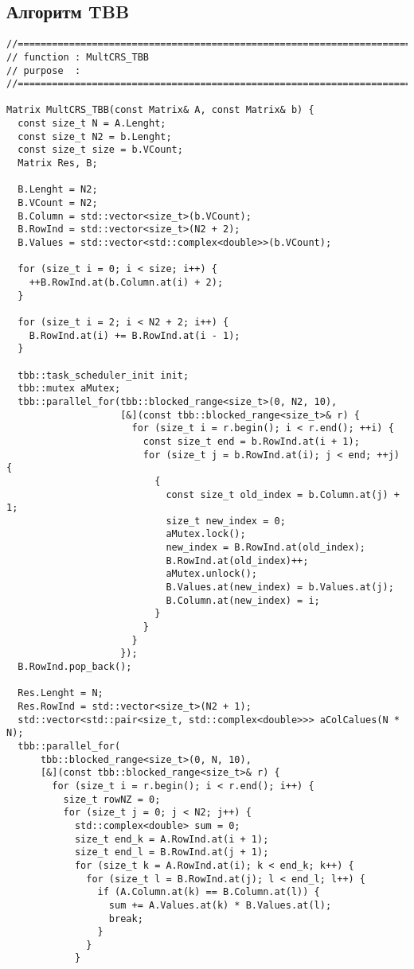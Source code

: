\documentclass{report}
\begin{document}
\subsection*{Алгоритм TBB}
\begin{lstlisting}
//=======================================================================
// function : MultCRS_TBB
// purpose  :
//=======================================================================

Matrix MultCRS_TBB(const Matrix& A, const Matrix& b) {
  const size_t N = A.Lenght;
  const size_t N2 = b.Lenght;
  const size_t size = b.VCount;
  Matrix Res, B;

  B.Lenght = N2;
  B.VCount = N2;
  B.Column = std::vector<size_t>(b.VCount);
  B.RowInd = std::vector<size_t>(N2 + 2);
  B.Values = std::vector<std::complex<double>>(b.VCount);

  for (size_t i = 0; i < size; i++) {
    ++B.RowInd.at(b.Column.at(i) + 2);
  }

  for (size_t i = 2; i < N2 + 2; i++) {
    B.RowInd.at(i) += B.RowInd.at(i - 1);
  }

  tbb::task_scheduler_init init;
  tbb::mutex aMutex;
  tbb::parallel_for(tbb::blocked_range<size_t>(0, N2, 10),
                    [&](const tbb::blocked_range<size_t>& r) {
                      for (size_t i = r.begin(); i < r.end(); ++i) {
                        const size_t end = b.RowInd.at(i + 1);
                        for (size_t j = b.RowInd.at(i); j < end; ++j) {
                          {
                            const size_t old_index = b.Column.at(j) + 1;
                            size_t new_index = 0;
                            aMutex.lock();
                            new_index = B.RowInd.at(old_index);
                            B.RowInd.at(old_index)++;
                            aMutex.unlock();
                            B.Values.at(new_index) = b.Values.at(j);
                            B.Column.at(new_index) = i;
                          }
                        }
                      }
                    });
  B.RowInd.pop_back();

  Res.Lenght = N;
  Res.RowInd = std::vector<size_t>(N2 + 1);
  std::vector<std::pair<size_t, std::complex<double>>> aColCalues(N * N);
  tbb::parallel_for(
      tbb::blocked_range<size_t>(0, N, 10),
      [&](const tbb::blocked_range<size_t>& r) {
        for (size_t i = r.begin(); i < r.end(); i++) {
          size_t rowNZ = 0;
          for (size_t j = 0; j < N2; j++) {
            std::complex<double> sum = 0;
            size_t end_k = A.RowInd.at(i + 1);
            size_t end_l = B.RowInd.at(j + 1);
            for (size_t k = A.RowInd.at(i); k < end_k; k++) {
              for (size_t l = B.RowInd.at(j); l < end_l; l++) {
                if (A.Column.at(k) == B.Column.at(l)) {
                  sum += A.Values.at(k) * B.Values.at(l);
                  break;
                }
              }
            }


\end{lstlisting}
\end{document}
